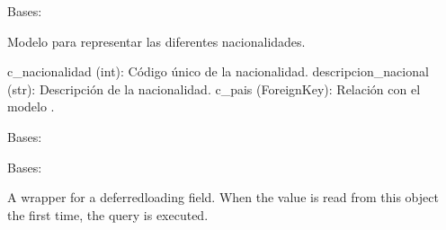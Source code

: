 \documentclass[letterpaper,10pt,spanish]{sphinxmanual}
\begin{document}
\begin{fulllineitems}

\pysigstartsignatures
{}
\pysigstopsignatures
\sphinxAtStartPar
Bases: 

\sphinxAtStartPar
Modelo para representar las diferentes nacionalidades.
\begin{description}
\sphinxAtStartPar
c\_nacionalidad (int): Código único de la nacionalidad.
descripcion\_nacional (str): Descripción de la nacionalidad.
c\_pais (ForeignKey): Relación con el modelo .

\end{description}


\begin{fulllineitems}

\pysigstartsignatures
{}
\pysigstopsignatures
\sphinxAtStartPar
Bases: 

\end{fulllineitems}



\begin{fulllineitems}

\pysigstartsignatures
{}
\pysigstopsignatures
\sphinxAtStartPar
Bases: 

\end{fulllineitems}



\begin{fulllineitems}

\pysigstartsignatures
{}
\pysigstopsignatures
\sphinxAtStartPar
A wrapper for a deferred\sphinxhyphen{}loading field. When the value is read from this
object the first time, the query is executed.

\end{fulllineitems}




\end{fulllineitems}
\end{document}
